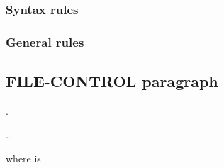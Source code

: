 \subsubsection{Syntax rules}

\subsubsection{General rules}

\subsection{FILE-CONTROL paragraph}

\begin{syntax}
  \begin{0-1}
    .
  \end{0-1}\newline
  \begin{0-1}
  \end{0-1} \ldots
\end{syntax}

where  is


